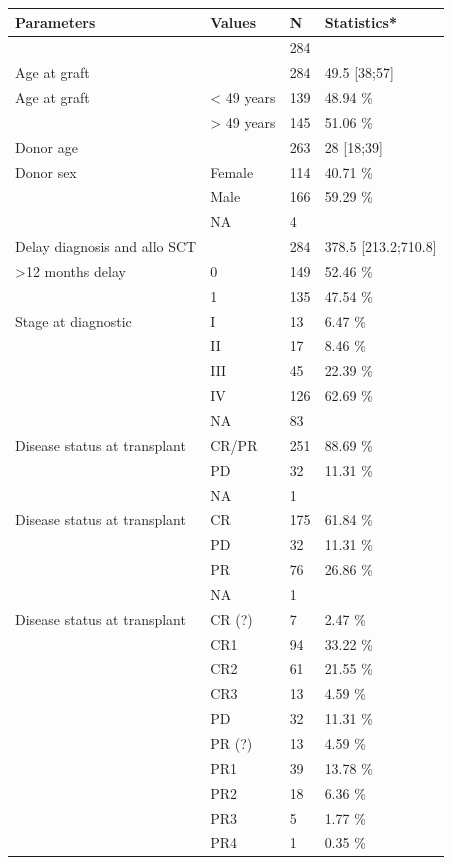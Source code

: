 \documentclass[a4paper,11pt] {article}
\begin{document}
\begin{longtable}{llll}
  \hline
Parameters & Values & N & Statistics* \\ 
  \hline
 &  & 284 &  \\ 
  Age at graft &  & 284 & 49.5 [38;57] \\ 
  Age at graft & < 49 years & 139 & 48.94 \% \\ 
   & > 49 years & 145 & 51.06 \% \\ 
  Donor age &  & 263 & 28 [18;39] \\ 
  Donor sex & Female & 114 & 40.71 \% \\ 
   & Male & 166 & 59.29 \% \\ 
   & NA & 4 &  \\ 
  Delay diagnosis and allo SCT &  & 284 & 378.5 [213.2;710.8] \\ 
  >12 months delay & 0 & 149 & 52.46 \% \\ 
   & 1 & 135 & 47.54 \% \\ 
  Stage at diagnostic & I & 13 & 6.47 \% \\ 
   & II & 17 & 8.46 \% \\ 
   & III & 45 & 22.39 \% \\ 
   & IV & 126 & 62.69 \% \\ 
   & NA & 83 &  \\ 
  Disease status at transplant & CR/PR & 251 & 88.69 \% \\ 
   & PD & 32 & 11.31 \% \\ 
   & NA & 1 &  \\ 
  Disease status at transplant & CR & 175 & 61.84 \% \\ 
   & PD & 32 & 11.31 \% \\ 
   & PR & 76 & 26.86 \% \\ 
   & NA & 1 &  \\ 
  Disease status at transplant & CR (?) & 7 & 2.47 \% \\ 
   & CR1 & 94 & 33.22 \% \\ 
   & CR2 & 61 & 21.55 \% \\ 
   & CR3 & 13 & 4.59 \% \\ 
   & PD & 32 & 11.31 \% \\ 
   & PR (?) & 13 & 4.59 \% \\ 
   & PR1 & 39 & 13.78 \% \\ 
   & PR2 & 18 & 6.36 \% \\ 
   & PR3 & 5 & 1.77 \% \\ 
   & PR4 & 1 & 0.35 \% \\ 

\end{longtable}
\end{document}

